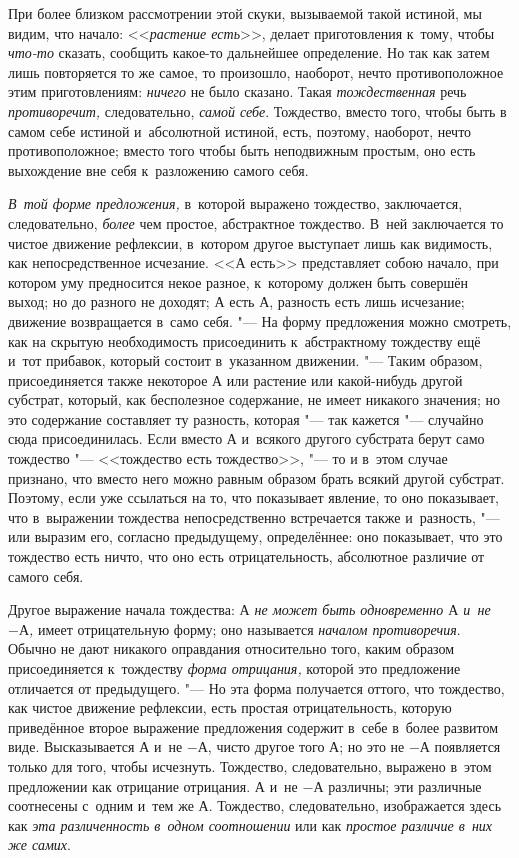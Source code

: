 При более близком рассмотрении этой скуки, вызываемой такой истиной, мы
видим, что начало: <<{\em растение есть}>>, делает
приготовления к~тому, чтобы {\em что-то} сказать,
сообщить какое-то дальнейшее определение. Но так как затем лишь повторяется
то же самое, то произошло, наоборот, нечто противоположное этим
приготовлениям: {\em ничего} не было сказано. Такая
{\em тождественная} речь {\em противоречит,} следовательно,
{\em самой себе}. Тождество, вместо того, чтобы быть в
самом себе истиной и~абсолютной истиной, есть, поэтому, наоборот, нечто
противоположное; вместо того чтобы быть неподвижным простым, оно есть
выхождение вне себя к~разложению самого себя.

{\em В~той форме предложения,} в~которой выражено
тождество, заключается, следовательно, {\em более} чем
простое, абстрактное тождество. В~ней заключается то чистое движение
рефлексии, в~котором другое выступает лишь как видимость, как
непосредственное исчезание. <<$А$ есть>> представляет собою начало,
при котором уму предносится некое разное, к~которому должен быть совершён
выход; но до разного не доходят; $А$ есть $А$, разность есть
лишь исчезание; движение возвращается в~само себя. "--- На форму предложения
можно смотреть, как на скрытую необходимость присоединить к~абстрактному
тождеству ещё и~тот прибавок, который состоит в~указанном движении. "--- Таким
образом, присоединяется также некоторое $А$ или растение или
какой-нибудь другой субстрат, который, как бесполезное содержание, не имеет
никакого значения; но это содержание составляет ту разность, которая "--- так
кажется "--- случайно сюда присоединилась. Если вместо $А$ и~всякого другого
субстрата берут само тождество "--- <<тождество есть тождество>>, "--- то и
в~этом случае признано, что вместо него можно равным образом брать всякий
другой субстрат. Поэтому, если уже ссылаться на то, что показывает явление,
то оно показывает, что в~выражении тождества непосредственно встречается
также и~разность, "--- или выразим его, согласно предыдущему, определённее:
оно показывает, что это тождество есть ничто, что оно есть отрицательность,
абсолютное различие от самого себя.

Другое выражение начала тождества: {\em $А$ не может быть
одновременно $А$ и~не $-А$,} имеет отрицательную форму; оно называется
{\em началом противоречия}. Обычно не дают никакого
оправдания относительно того, каким образом присоединяется к~тождеству
{\em форма отрицания,} которой это предложение
отличается от предыдущего. "--- Но эта форма получается оттого, что тождество,
как чистое движение рефлексии, есть простая отрицательность, которую
приведённое второе выражение предложения содержит в~себе в~более развитом
виде. Высказывается $А$ и~не $-А$, чисто другое того
$А$; но это не $-А$ появляется только для того, чтобы
исчезнуть. Тождество, следовательно, выражено в~этом предложении как
отрицание отрицания. $А$ и~не $-А$ различны; эти различные
соотнесены с~одним и~тем же $А$. Тождество, следовательно,
изображается здесь как {\em эта различенность в~одном
соотношении} или как {\em простое различие в~них же
самих}.

